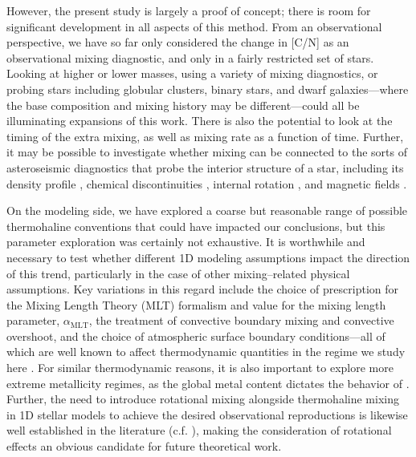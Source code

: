 However, the present study is largely a proof of concept;
there is room for significant development in all aspects of this method. From an observational perspective, we have so far only considered the change in [C/N] as an observational mixing diagnostic, and only in a fairly restricted set of stars. Looking at higher or lower masses, using a variety of mixing diagnostics, or probing stars including globular clusters, binary stars, and dwarf galaxies---where the base composition and mixing history may be different---could all be illuminating expansions of this work. There is also the potential to look at the timing of the extra mixing, as well as mixing rate as a function of time. Further, it may be possible to investigate whether mixing can be connected to the sorts of asteroseismic diagnostics that probe the interior structure of a star, including its density profile \citep{KjeldsenBedding1995}, chemical discontinuities \citep{Verma2017}, internal rotation \citep{Gehan2018}, and magnetic fields \citep{Bugnet2021}. 

On the modeling side, we have explored a coarse but reasonable range of possible thermohaline conventions that could have impacted our conclusions, but this parameter exploration was certainly not exhaustive. It is worthwhile and necessary to test whether different 1D modeling assumptions impact the direction of this trend, particularly in the case of other mixing--related physical assumptions. Key variations in this regard include the choice of prescription for the Mixing Length Theory (MLT) formalism and value for the mixing length parameter, $\alpha_{\text{MLT}}$, the treatment of convective boundary mixing and convective overshoot, and the choice of atmospheric surface boundary conditions---all of which are well known to affect thermodynamic quantities in the regime we study here \citep{tayar2017, Joyce2018a, Joyce2018b, viani2018}. For similar thermodynamic reasons, it is also important to explore more extreme metallicity regimes, as the global metal content dictates the behavior of \gradmu.
%
Further, the need to introduce rotational mixing alongside thermohaline mixing in 1D stellar models to achieve the desired observational reproductions is likewise well established in the literature (c.f. \citealt{Charbonnel2010}), making the consideration of rotational effects an obvious candidate for future theoretical work.

